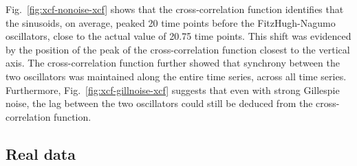 Fig.\ \ref{fig:xcf-nonoise-xcf} shows that the cross-correlation function identifies that the sinusoids, on average, peaked 20 time points before the FitzHugh-Nagumo oscillators, close to the actual value of 20.75 time points.
This shift was evidenced by the position of the peak of the cross-correlation function closest to the vertical axis.
The cross-correlation function further showed that synchrony between the two oscillators was maintained along the entire time series, across all time series.
Furthermore, Fig.\ \ref{fig:xcf-gillnoise-xcf} suggests that even with strong Gillespie noise, the lag between the two oscillators could still be deduced from the cross-correlation function.


\subsection{Real data}
\label{subsubsec:analysis-correlation-real}


